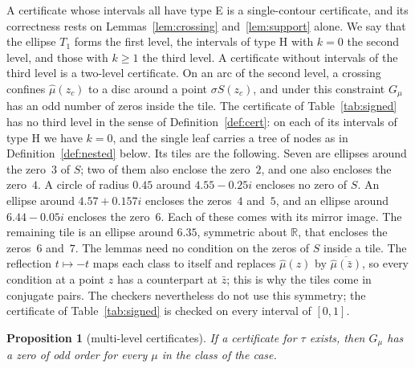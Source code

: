\documentclass[11pt]{amsart}
\newtheorem{proposition}[theorem]{Proposition}
\theoremstyle{definition}
\theoremstyle{remark}
\numberwithin{equation}{section}
\newcommand{\R}{\mathbb{R}}
\newcommand{\QSymTail}{; the certificate of Table~\ref{tab:signed} is checked on every interval of $[0,1]$}
\begin{document}
A certificate whose intervals all have type E is a single-contour certificate, and its correctness rests on Lemmas~\ref{lem:crossing} and~\ref{lem:support} alone. We say that the ellipse $T_1$ forms the first level, the intervals of type H with $k=0$ the second level, and those with $k\ge1$ the third level. A certificate without intervals of the third level is a two-level certificate. On an arc of the second level, a crossing confines $\hat\mu(z_c)$ to a disc around a point $\sigma S(z_c)$, and under this constraint $G_\mu$ has an odd number of zeros inside the tile. The certificate of Table~\ref{tab:signed} has no third level in the sense of Definition~\ref{def:cert}: on each of its intervals of type H we have $k=0$, and the single leaf carries a tree of nodes as in Definition~\ref{def:nested} below. Its tiles are the following. Seven are ellipses around the zero~$3$ of $S$; two of them also enclose the zero~$2$, and one also encloses the zero~$4$. A circle of radius $0.45$ around $4.55-0.25i$ encloses no zero of $S$. An ellipse around $4.57+0.157i$ encloses the zeros~$4$ and~$5$, and an ellipse around $6.44-0.05i$ encloses the zero~$6$. Each of these comes with its mirror image. The remaining tile is an ellipse around $6.35$, symmetric about $\R$, that encloses the zeros~$6$ and~$7$.
The lemmas need no condition on the zeros of $S$ inside a tile. The reflection $t\mapsto-t$ maps each class to itself and replaces $\hat\mu(z)$ by $\overline{\hat\mu(\bar z)}$, so every condition at a point $z$ has a counterpart at $\bar z$; this is why the tiles come in conjugate pairs. The checkers nevertheless do not use this symmetry\QSymTail.

\begin{proposition}[multi-level certificates]\label{prop:multilevel}
If a certificate for $\tau$ exists, then $G_\mu$ has a zero of odd order for every $\mu$ in the class of the case.
\end{proposition}
\end{document}
